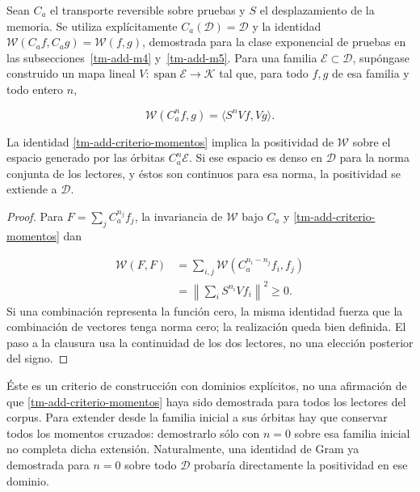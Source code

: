 Sean \(C_a\) el transporte reversible sobre pruebas y \(S\) el desplazamiento de la memoria. Se utiliza explícitamente \(C_a(\mathcal D)=\mathcal D\) y la identidad \(\mathscr W(C_af,C_ag)=\mathscr W(f,g)\), demostrada para la clase exponencial de pruebas en las subsecciones~\ref{tm-add-m4} y~\ref{tm-add-m5}. Para una familia \(\mathcal E\subset\mathcal D\), supóngase construido un mapa lineal \(V:\operatorname{span}\mathcal E\to\mathcal K\) tal que, para todo \(f,g\) de esa familia y todo entero \(n\),

\begin{equation}
\boxed{\mathscr W(C_a^n f,g)=\langle S^nVf,Vg\rangle.}
\label{tm-add-criterio-momentos}
\end{equation}
\begin{proposition}
\label{tm-add-proposicion-costura-3}
La identidad \eqref{tm-add-criterio-momentos} implica la positividad de \(\mathscr W\) sobre el espacio generado por las órbitas \(C_a^n\mathcal E\). Si ese espacio es denso en \(\mathcal D\) para la norma conjunta de los lectores, y éstos son continuos para esa norma, la positividad se extiende a \(\mathcal D\).
\end{proposition}

\begin{proof}
Para \(F=\sum_j C_a^{n_j}f_j\), la invariancia de \(\mathscr W\) bajo \(C_a\) y \eqref{tm-add-criterio-momentos} dan

\[
\begin{aligned}
\mathscr W(F,F)
&=\sum_{i,j}\mathscr W(C_a^{n_i-n_j}f_i,f_j)\\
&=\left\|\sum_i S^{n_i}Vf_i\right\|^2\geq0.
\end{aligned}
\]
Si una combinación representa la función cero, la misma identidad fuerza que la combinación de vectores tenga norma cero; la realización queda bien definida. El paso a la clausura usa la continuidad de los dos lectores, no una elección posterior del signo.
\end{proof}

Éste es un criterio de construcción con dominios explícitos, no una afirmación de que \eqref{tm-add-criterio-momentos} haya sido demostrada para todos los lectores del corpus. Para extender desde la familia inicial a sus órbitas hay que conservar todos los momentos cruzados: demostrarlo sólo con \(n=0\) sobre esa familia inicial no completa dicha extensión. Naturalmente, una identidad de Gram ya demostrada para \(n=0\) sobre todo \(\mathcal D\) probaría directamente la positividad en ese dominio.


